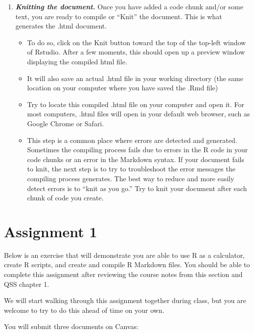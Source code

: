 \documentclass[
  letterpaper,
  DIV=11,
  numbers=noendperiod]{scrreprt}
\providecommand{\tightlist}{%
  \setlength{\itemsep}{0pt}\setlength{\parskip}{0pt}}\usepackage{longtable,booktabs,array}
\begin{document}
\begin{enumerate}
\def\labelenumi{\arabic{enumi}.}
\setcounter{enumi}{6}
\tightlist
\item
  \textbf{\emph{Knitting the document.}} Once you have added a code
  chunk and/or some text, you are ready to compile or ``Knit'' the
  document. This is what generates the .html document.

  \begin{itemize}
  \tightlist
  \item
    To do so, click on the Knit button toward the top of the top-left
    window of Rstudio. After a few moments, this should open up a
    preview window displaying the compiled html file.
  \item
    It will also save an actual .html file in your working directory
    (the same location on your computer where you have saved the .Rmd
    file)
  \item
    Try to locate this compiled .html file on your computer and open it.
    For most computers, .html files will open in your default web
    browser, such as Google Chrome or Safari.
  \item
    This step is a common place where errors are detected and generated.
    Sometimes the compiling process fails due to errors in the R code in
    your code chunks or an error in the Markdown syntax. If your
    document fails to knit, the next step is to try to troubleshoot the
    error messages the compiling process generates. The best way to
    reduce and more easily detect errors is to ``knit as you go.'' Try
    to knit your document after each chunk of code you create.
  \end{itemize}
\end{enumerate}

\hypertarget{assignment-1}{%
\section{Assignment 1}\label{assignment-1}}

Below is an exercise that will demonstrate you are able to use R as a
calculator, create R scripts, and create and compile R Markdown files.
You should be able to complete this assignment after reviewing the
course notes from this section and QSS chapter 1.

We will start walking through this assignment together during class, but
you are welcome to try to do this ahead of time on your own.

You will submit three documents on Canvas:
\end{document}
